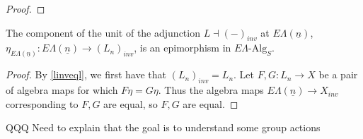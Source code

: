 \documentclass{amsbook} %
\newcommand{\ELn}{E\Lambda(\underline{n})}
\numberwithin{section}{chapter}
\begin{document}
\begin{proof}
\end{proof}


\begin{cor} \label{epi} The component of the unit of the adjunction $L \dashv (-)_{inv}$ at $E\Lambda(\underline{n})$,  $\eta_{E\Lambda(\underline{n})}: E\Lambda(\underline{n}) \to (L_n)_{inv}$, is an epimorphism in $E\Lambda\mbox{-}\mathrm{Alg}_S$.
\end{cor}
\begin{proof}

By \cref{linveql}, we first have that $(L_n)_{inv} = L_n$. Let $F,G: L_n \to X$ be a pair of algebra maps for which $F \eta = G \eta$. Thus the algebra maps $E\Lambda(\underline{n}) \to X_{inv}$ corresponding to $F, G$ are equal, so $F,G$ are equal.



\end{proof}


QQQ Need to explain that the goal is to understand some group actions

\end{document}
